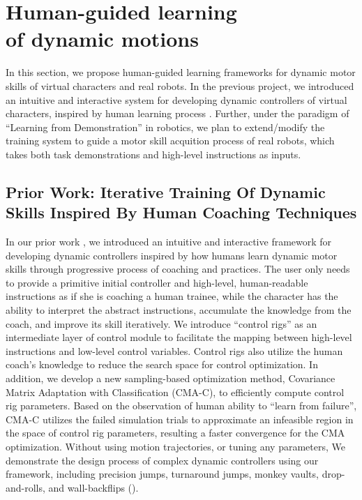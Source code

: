 \chapter{Human-guided learning \protect\\ of dynamic motions}
In this section, we propose human-guided learning frameworks for
dynamic motor skills of virtual characters and real robots.
In the previous project, we introduced an intuitive and 
interactive system for developing dynamic controllers 
of virtual characters,
inspired by human learning process \cite{fitts:1967:hp}.
Further, under the paradigm of ``Learning from Demonstration''
in robotics,
we plan to extend/modify the training system to guide 
a motor skill acquition process of real robots, which
takes both task demonstrations and high-level instructions as inputs.

\section{Prior Work: Iterative Training Of Dynamic Skills Inspired By Human Coaching Techniques}

In our prior work \cite{Ha:2014:ITD},
we introduced an intuitive and interactive framework for developing 
dynamic controllers inspired by how humans learn dynamic motor
skills through progressive process of coaching and practices. 
The user only needs to provide a primitive initial controller and
high-level, human-readable instructions as if
she is coaching a human trainee, while the character has the ability
to interpret the abstract instructions, accumulate the knowledge from
the coach, and improve its skill iteratively. We introduce ``control
rigs'' as an intermediate layer of control module to facilitate the
mapping between high-level instructions and low-level control
variables. Control rigs also utilize the human coach's knowledge to
reduce the search space for control optimization. In addition, we
develop a new sampling-based optimization method, Covariance Matrix
Adaptation with Classification (CMA-C), to efficiently compute control
rig parameters. Based on the observation of human ability to ``learn
from failure'', CMA-C utilizes the failed simulation trials to
approximate an infeasible region in the space of control rig
parameters, resulting a faster convergence for the CMA
optimization. 
Without using motion trajectories, or tuning any parameters,
We demonstrate the design process of complex dynamic
controllers using our framework, including precision jumps, turnaround
jumps, monkey vaults, drop-and-rolls, and wall-backflips 
().



